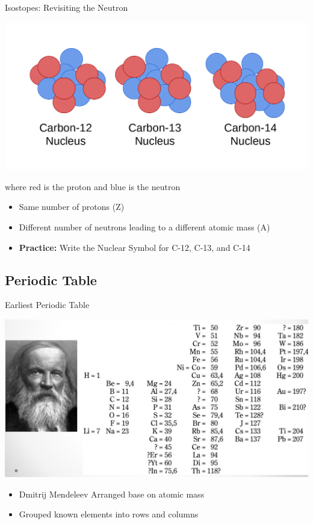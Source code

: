 \documentclass[11pt]{beamer}
\begin{document}
\begin{frame}{Isostopes: Revisiting the Neutron}
  \begin{center}
    \includegraphics[scale=0.2]{carbon_isotopes}
  \end{center}
  where red is the proton and blue is the neutron
  
  \begin{itemize}
  \item Same number of protons (Z)
  \item Different number of neutrons leading to
    a different atomic mass (A)
  \item \textbf{Practice:} Write the Nuclear Symbol for
    C-12, C-13, and C-14
  \end{itemize}
\end{frame}

\subsection{Periodic Table}

\begin{frame}{Earliest Periodic Table}
  \begin{center}
    \includegraphics[scale=0.13]{mendeleev_table}
  \end{center}
  
  \begin{itemize}
  \item Dmitrij Mendeleev Arranged base on atomic mass
  \item Grouped known elements into rows and columns
  \end{itemize}
\end{frame}
\end{document}
